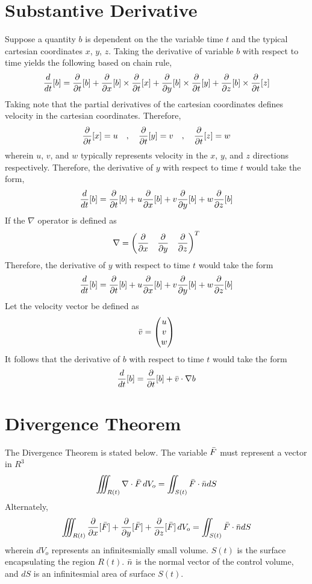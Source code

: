 \documentclass[class=report, 12pt, crop=false]{standalone}
\begin{document}
\begin{center}
\section{Substantive Derivative}
\begin{comment}
Substantive Derivative
Needs Serious revamping
\end{comment}
Suppose a quantity $b$ is dependent on the the variable time $t$ and the typical cartesian coordinates $x$, $y$, $z$. Taking the derivative of variable $b$ with respect to time yields the following based on chain rule,
$$\frac{d}{dt}[b] = \frac{\partial}{\partial t}[b] + \frac{\partial}{\partial x}[b]\times\frac{\partial}{\partial t}[x] + \frac{\partial}{\partial y}[b]\times\frac{\partial}{\partial t}[y] + \frac{\partial}{\partial z}[b]\times\frac{\partial}{\partial t}[z]$$
Taking note that the partial derivatives of the cartesian coordinates defines velocity in the cartesian coordinates. Therefore, 
$$\frac{\partial}{\partial t}[x] = u\quad,\quad \frac{\partial}{\partial t}[y] = v\quad,\quad \frac{\partial}{\partial t}[z] = w$$
wherein $u$, $v$, and $w$ typically represents velocity in the $x$, $y$, and $z$ directions respectively. Therefore, the derivative of $y$ with respect to time $t$ would take the form,
$$\frac{d}{dt}[b] = \frac{\partial}{\partial t}[b] + u\frac{\partial}{\partial x}[b] + v\frac{\partial}{\partial y}[b] + w\frac{\partial}{\partial z}[b]$$
If the $\nabla$ operator is defined as
$$\nabla = \begin{pmatrix} \displaystyle{\frac{\partial}{\partial x}}& \displaystyle{\frac{\partial}{\partial y}}& \displaystyle{\frac{\partial}{\partial z}} \end{pmatrix}^T$$
Therefore, the derivative of $y$ with respect to time $t$ would take the form
$$\frac{d}{dt}[b] = \frac{\partial}{\partial t}[b] + u\frac{\partial}{\partial x}[b] + v\frac{\partial}{\partial y}[b] + w\frac{\partial}{\partial z}[b]$$
Let the velocity vector be defined as 
$$\bar{v} = \begin{pmatrix}u\\v\\w\\ \end{pmatrix}$$
It follows that the derivative of $b$ with respect to time $t$ would take the form
$$\frac{d}{dt}[b] = \frac{\partial}{\partial t}[b] + \bar{v}\cdot\nabla b$$
\section{Divergence Theorem}
\begin{comment}
Divergence Theorem
\end{comment}
The Divergence Theorem is stated below. The variable $\bar{F}$ must represent a vector in $R^3$
$$\iiint_{R(t)}  \nabla \cdot \bar{F} \,dV_o = \iint_{S(t)}\bar{F}\cdot \bar{n}dS$$
Alternately,
$$\iiint_{R(t)}  \frac{\partial}{\partial x}[\bar{F}] + \frac{\partial}{\partial y}[\bar{F}] + \frac{\partial}{\partial z}[\bar{F}] \,dV_o = \iint_{S(t)}\bar{F}\cdot \bar{n}dS$$
wherein $dV_o$ represents an infinitesmially small volume. $S(t)$ is the surface encapsulating the region $R(t)$. $\bar{n}$ is the normal vector of the control volume, and $dS$ is an infinitesmial area of surface $S(t)$.
\end{center}
\end{document}
